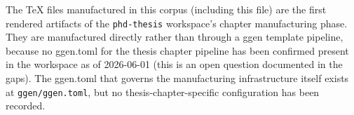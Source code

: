 The TeX files manufactured in this corpus (including this file) are the first rendered
artifacts of the \texttt{phd-thesis} workspace's chapter manufacturing phase. They are
manufactured directly rather than through a ggen template pipeline, because no ggen.toml
for the thesis chapter pipeline has been confirmed present in the workspace as of
2026-06-01 (this is an open question documented in the gaps). The ggen.toml that governs
the manufacturing infrastructure itself exists at \texttt{ggen/ggen.toml}, but no
thesis-chapter-specific configuration has been recorded.

